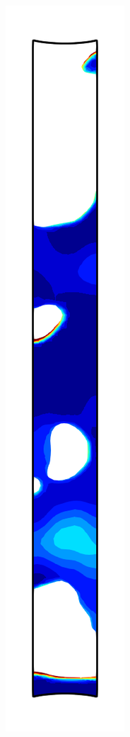 \begin{figure}[!htb]
\begin{subfigure}{0.08\textwidth}
  \end{subfigure}
  \begin{subfigure}{0.08\textwidth}
    \centering
    \includegraphics[width=\textwidth]{Chapter5/figures/spallation/psii_3}

\end{subfigure}
\end{figure}
